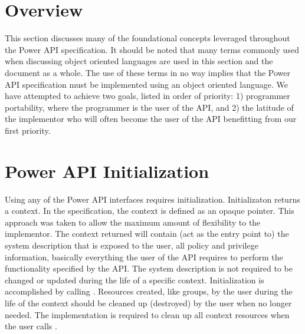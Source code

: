
\section{Overview}
This section discusses many of the foundational concepts leveraged throughout the Power API specification.
It should be noted that many terms commonly used when discussing object oriented languages are used in this section and the document as a whole.
The use of these terms in no way implies that the Power API specification must be implemented using an object oriented language.
We have attempted to achieve two goals, listed in order of priority: 1) programmer portability, where the programmer is the user of the API, and 2) the latitude of the implementor who will often become the user of the API benefitting from our first priority. 

\section{Power API Initialization}\label{sec:PowerAPIInit}


Using any of the Power API interfaces requires initialization. 
Initializaton returns a context.
In the specification, the context is defined as an opaque pointer.
This approach was taken to allow the maximum amount of flexibility to the implementor.
The context returned will contain (act as the entry point to) the system description that is exposed to the user, all policy and privilege information, basically everything the user of the API requires to perform the functionality specified by the API.
The system description is not required to be changed or updated during the life of a specific context.
Initialization is accomplished by calling .
Resources created, like groups, by the user during the life of the context should be cleaned up (destroyed) by the user when no longer needed. 
The implementation is required to clean up all context resources when the user calls .

